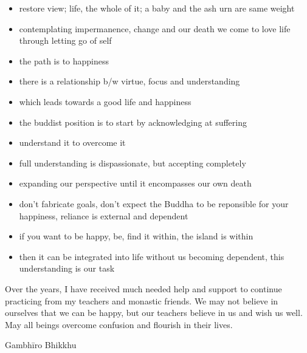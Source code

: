 \begin{itemize}
\item
  restore view; life, the whole of it; a baby and the ash urn are same
  weight
\item
  contemplating impermanence, change and our death we come to love life
  through letting go of self
\item
  the path is to happiness
\item
  there is a relationship b/w virtue, focus and understanding
\item
  which leads towards a good life and happiness
\item
  the buddist position is to start by acknowledging at suffering
\item
  understand it to overcome it
\item
  full understanding is dispassionate, but accepting completely
\item
  expanding our perspective until it encompasses our own death
\item
  don't fabricate goals, don't expect the Buddha to be reponsible for
  your happiness, reliance is external and dependent
\item
  if you want to be happy, be, find it within, the island is within
\item
  then it can be integrated into life without us becoming dependent,
  this understanding is our task
\end{itemize}

Over the years, I have received much needed help and support to continue
practicing from my teachers and monastic friends. We may not believe in
ourselves that we can be happy, but our teachers believe in us and wish
us well. May all beings overcome confusion and flourish in their lives.

Gambhīro Bhikkhu
